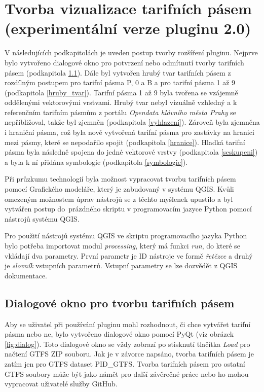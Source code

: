 \section{Tvorba vizualizace tarifních pásem (experimentální verze pluginu 2.0)}

V následujících podkapitolách je uveden postup tvorby rozšíření pluginu.
Nejprve bylo vytvořeno dialogové okno pro potvrzení nebo odmítnutí tvorby tarifních pásem (podkapitola \ref{dialog}).
Dále byl vytvořen hrubý tvar tarifních pásem z rozdílným po\-stupem pro tarifní pásma P, 0 a B
a pro tarifní pásma 1 až 9 (podkapitola \ref{hruby_tvar}). 
Tarifní pásma 1 až 9 byla tvořena se vzájemně oddělenými vektorovými vrstvami.
Hrubý tvar nebyl vizuálně vzhledný a k referenčním tarifním pásmům
z portálu \textit{Opendata hlávního města Prahy} se nepřibližoval, takže byl zjemněn (podkapitola \ref{vyhlazeni}).
Zároveň byla zjemněna i hraniční pásma, což byla nově vytvořená tarifní pásma pro zastávky
na hranici mezi pásmy, které se nepodařilo spojit (podkapitola \ref{hranice}). 
Hladká tarifní pásma byla následně spojena do jedné vektorové vrstvy (podkapitola \ref{seskupeni}) a 
byla k ní přidána symbologie (podkapitola \ref{symbologie}).

Při průzkumu technologií byla možnost vypracovat tvorbu tarifních pásem pomocí Grafického modeláře,
který je zabudovaný v systému QGIS.
Kvůli omezeným možnostem úprav nástrojů se z těchto myšlenek upustilo a byl vytvářen postup
do~prázdného skriptu v programovacím jazyce Python pomocí nástrojů systému QGIS.

Pro použití nástrojů systému QGIS ve skriptu programovacího jazyka Python bylo potřeba importovat modul \textit{processing},
který má funkci \textit{run}, do které se vkládají dva parametry. První parametr je ID nástroje
ve formě \textit{řetězce} a druhý je \textit{slovník} vstupních parametrů. Vstupní parametry se lze dozvědět
z QGIS dokumentace. \cite{QGIS_docs}

\subsection{Dialogové okno pro tvorbu tarifních pásem}
\label{dialog}

Aby se uživatel při používání pluginu mohl rozhodnout, či chce vytvářet tarifní pásma nebo ne, bylo vytvořeno
dialogové okno pomocí PyQt (viz obrázek \ref{fig:dialog}). Toto dialogové okno se vždy zobrazí po stisknutí tlačítka
\textit{Load} pro načtení GTFS ZIP souboru. Jak je v závorce napsáno, tvorba tarifních pásem je zatím jen pro GTFS
dataset PID\_GTFS. Tvorba tarifních pásem pro ostatní GTFS soubory může být jako námět pro další závěrečné práce nebo ho mohou 
vypracovat uživatelé služby GitHub.

